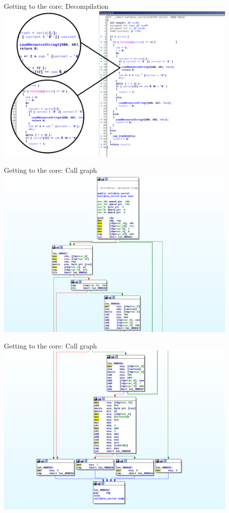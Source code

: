 \documentclass[10pt, compress, aspectratio=169]{beamer}
\begin{document}
\begin{frame}{Getting to the core: Decompilation}
	\includegraphics[width=0.9\textwidth]{images/sc1-4-validator-rev-zoom.png}
\end{frame}

\begin{frame}{Getting to the core: Call graph}
	\includegraphics[width=0.9\textwidth]{images/sc1-5a-validator-graph.png}
\end{frame}

\begin{frame}{Getting to the core: Call graph}
	\includegraphics[width=0.9\textwidth]{images/sc1-5b-validator-graph.png}
\end{frame}
\end{document}
